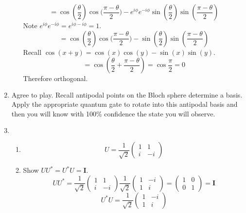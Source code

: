 \documentclass[12pt]{article}
\begin{document}
\begin{enumerate}[font=\bfseries]
\begin{enumerate}
        \[
        = \cos{(\frac{\theta}{2})}\cos({\frac{\pi-\theta}{2})} - e^{i\phi}e^{-i\phi}\sin{(\frac{\theta}{2})}\sin{(\frac{\pi - \theta}{2})}
        \]
        Note $e^{i\phi}e^{-i\phi} = e^{i\phi - i\phi} = 1$.
        \[
        = \cos{(\frac{\theta}{2})}\cos({\frac{\pi-\theta}{2})} - \sin{(\frac{\theta}{2})}\sin{(\frac{\pi - \theta}{2})}
        \]
        Recall $\cos{(x + y)} = \cos{(x)}\cos{(y)} - \sin{(x)}\sin{(y)}$.
        \[
        = \cos{(\frac{\theta}{2} + \frac{\pi - \theta}{2})} = \cos{\frac{\pi}{2}} = 0 
        \]
        Therefore orthogonal.
    \end{enumerate}
    \item Agree to play. Recall antipodal points on the Bloch sphere determine a basis. Apply the appropriate quantum gate to rotate into this antipodal basis and then you will know with 100\% confidence the state you will observe.
    \item 
        \begin{enumerate}
            \item \[U = \frac{1}{\sqrt{2}}\begin{pmatrix}
                        1 & 1 \\
                        i & -i
                        \end{pmatrix}\]
            \item Show $UU^* = U^*U = \mathbf{I}$. 
                \[UU^* = \frac{1}{\sqrt{2}}\begin{pmatrix}
                        1 & 1 \\
                        i & -i
                        \end{pmatrix}
                        \frac{1}{\sqrt{2}}\begin{pmatrix}
                        1 & -i \\
                        1 & i
                        \end{pmatrix}
                        =
                        \begin{pmatrix}
                        1 & 0 \\
                        0 & 1
                        \end{pmatrix}
                        = \mathbf{I}
                        \]
                \[U^*U = \frac{1}{\sqrt{2}}\begin{pmatrix}
                        1 & -i \\
                        1 & i
                        \end{pmatrix}
\]
\end{enumerate}
\end{enumerate}
\end{document}
